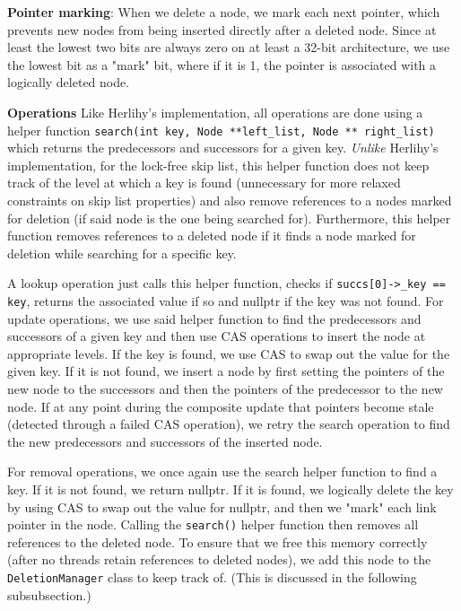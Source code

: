 \documentclass[11pt]{article}
\begin{document}
\textbf{Pointer marking}: When we delete a node, we mark each next pointer, which prevents new nodes from being inserted directly after a deleted node. Since at least the lowest two bits are always zero on at least a 32-bit architecture, we use the lowest bit as a "mark" bit, where if it is 1, the pointer is associated with a logically deleted node.

\textbf{Operations} Like Herlihy's implementation, all operations are done using a helper function \texttt{search(int key, Node **left\_list, Node ** right\_list)} which returns the predecessors and successors for a given key. \textit{Unlike} Herlihy's implementation, for the lock-free skip list, this helper function does not keep track of the level at which a key is found (unnecessary for more relaxed constraints on skip list properties) and also remove references to a nodes marked for deletion (if said node is the one being searched for). Furthermore, this helper function removes references to a deleted node if it finds a node marked for deletion while searching for a specific key.

A lookup operation just calls this helper function, checks if \texttt{succs[0]->\_key == key}, returns the associated value if so and nullptr if the key was not found. For update operations, we use said helper function to find the predecessors and successors of a given key and then use CAS operations to insert the node at appropriate levels. If the key is found, we use CAS to swap out the value for the given key. If it is not found, we insert a node by first setting the pointers of the new node to the successors and then the pointers of the predecessor to the new node. If at any point during the composite update that pointers become stale (detected through a failed CAS operation), we retry the search operation to find the new predecessors and successors of the inserted node.

For removal operations, we once again use the search helper function to find a key. If it is not found, we return nullptr. If it is found, we logically delete the key by using CAS to swap out the value for nullptr, and then we "mark" each link pointer in the node. Calling the \texttt{search()} helper function then removes all references to the deleted node. To ensure that we free this memory correctly (after no threads retain references to deleted nodes), we add this node to the \texttt{DeletionManager} class to keep track of. (This is discussed in the following subsubsection.)
\end{document}
